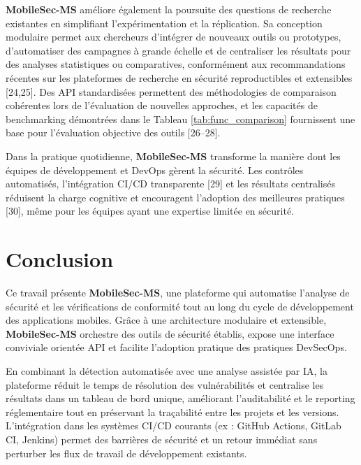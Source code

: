 \documentclass[
  journal=largetwo,
  manuscript=article-type,
  year=2025,
  volume=1,
]{cup-journal}
\begin{document}
\textbf{MobileSec-MS} améliore également la poursuite des questions de recherche existantes en simplifiant l'expérimentation et la réplication. Sa conception modulaire permet aux chercheurs d'intégrer de nouveaux outils ou prototypes, d'automatiser des campagnes à grande échelle et de centraliser les résultats pour des analyses statistiques ou comparatives, conformément aux recommandations récentes sur les plateformes de recherche en sécurité reproductibles et extensibles [24,25]. Des API standardisées permettent des méthodologies de comparaison cohérentes lors de l'évaluation de nouvelles approches, et les capacités de benchmarking démontrées dans le Tableau \ref{tab:func_comparison} fournissent une base pour l'évaluation objective des outils [26–28].

Dans la pratique quotidienne, \textbf{MobileSec-MS} transforme la manière dont les équipes de développement et DevOps gèrent la sécurité. Les contrôles automatisés, l'intégration CI/CD transparente [29] et les résultats centralisés réduisent la charge cognitive et encouragent l'adoption des meilleures pratiques [30], même pour les équipes ayant une expertise limitée en sécurité.

\section{Conclusion}
\label{sec:conclusion}

Ce travail présente \textbf{MobileSec-MS}, une plateforme qui automatise l'analyse de sécurité et les vérifications de conformité tout au long du cycle de développement des applications mobiles. Grâce à une architecture modulaire et extensible, \textbf{MobileSec-MS} orchestre des outils de sécurité établis, expose une interface conviviale orientée API et facilite l'adoption pratique des pratiques DevSecOps.

En combinant la détection automatisée avec une analyse assistée par IA, la plateforme réduit le temps de résolution des vulnérabilités et centralise les résultats dans un tableau de bord unique, améliorant l'auditabilité et le reporting réglementaire tout en préservant la traçabilité entre les projets et les versions. L'intégration dans les systèmes CI/CD courants (ex : GitHub Actions, GitLab CI, Jenkins) permet des barrières de sécurité et un retour immédiat sans perturber les flux de travail de développement existants.
\end{document}
